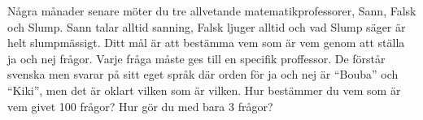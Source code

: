\begin{problem}
	Några månader senare möter du tre allvetande matematikprofessorer, Sann, Falsk och Slump. Sann talar alltid sanning, Falsk ljuger alltid och vad Slump säger är helt slumpmässigt. Ditt mål är att bestämma vem som är vem genom att ställa ja och nej frågor. Varje fråga måste ges till en specifik proffessor. De förstår svenska men svarar på sitt eget språk där orden för ja och nej är ``Bouba'' och ``Kiki'', men det är oklart vilken som är vilken. Hur bestämmer du vem som är vem givet 100 frågor? Hur gör du med bara 3 frågor?
\end{problem}

